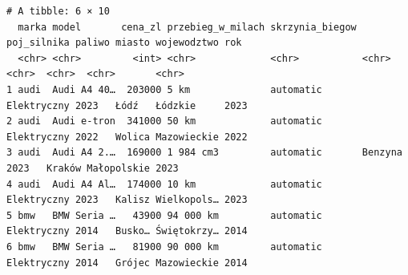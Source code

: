 \documentclass[
]{article}
\begin{document}
\begin{verbatim}
# A tibble: 6 × 10
  marka model       cena_zl przebieg_w_milach skrzynia_biegow poj_silnika paliwo miasto wojewodztwo rok  
  <chr> <chr>         <int> <chr>             <chr>           <chr>       <chr>  <chr>  <chr>       <chr>
1 audi  Audi A4 40…  203000 5 km              automatic       Elektryczny 2023   Łódź   Łódzkie     2023 
2 audi  Audi e-tron  341000 50 km             automatic       Elektryczny 2022   Wolica Mazowieckie 2022 
3 audi  Audi A4 2.…  169000 1 984 cm3         automatic       Benzyna     2023   Kraków Małopolskie 2023 
4 audi  Audi A4 Al…  174000 10 km             automatic       Elektryczny 2023   Kalisz Wielkopols… 2023 
5 bmw   BMW Seria …   43900 94 000 km         automatic       Elektryczny 2014   Busko… Świętokrzy… 2014 
6 bmw   BMW Seria …   81900 90 000 km         automatic       Elektryczny 2014   Grójec Mazowieckie 2014 
\end{verbatim}
\end{document}
